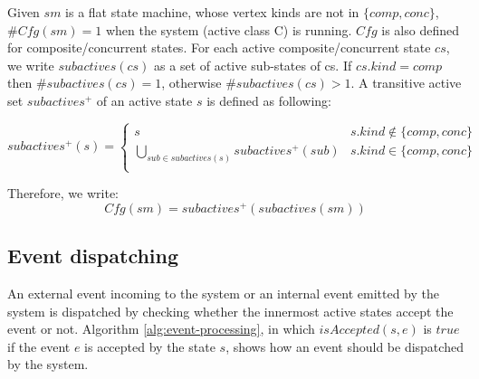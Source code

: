 
Given $sm$ is a flat state machine, whose vertex kinds are not in $\{comp, conc\}$, $\#Cfg (sm) = 1$ when the system (active class C) is running. 
$Cfg$ is also defined for composite/concurrent states. For each active composite/concurrent state $cs$, we write $subactives(cs)$ as a set of active sub-states of cs. If $cs.kind = comp$ then $\#subactives(cs) = 1$, otherwise $\#subactives(cs) > 1$. A transitive active set  $subactives^+$ of an active state $s$ is defined as following:

\begin{figure*}
	\normalsize
	\setcounter{mytempeqncnt}{\value{equation}}
	
	\begin{equation}
	subactives^+ (s) =    \left\{
	\begin{array}{ll}
	s & s.kind \notin \{comp, conc\}  \\
	\bigcup\limits_{sub \in subactives(s)} subactives^{+} (sub) & s.kind \in \{comp, conc\} \\
	\end{array} 
	\right. 
	\end{equation}
	\setcounter{equation}{\value{mytempeqncnt}}
\end{figure*}

	


Therefore, we write:
\begin{equation}
	Cfg(sm) = subactives^+(subactives(sm))
\end{equation}

\subsection{Event dispatching}
An external event incoming to the system or an internal event emitted by the system is dispatched by checking whether the innermost active states accept the event or not. Algorithm \ref{alg:event-processing}, in which $isAccepted(s, e)$ is $true$ if the event $e$ is accepted by the state $s$, shows how an event should be dispatched by the system.  

